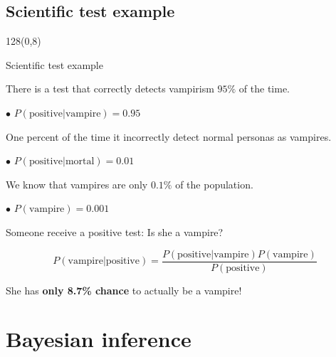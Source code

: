\documentclass[shownotes]{beamer}
\begin{document}
\subsection{Scientific test example}

\begin{frame}
\begin{textblock}{128}(0,8)
\begin{center}
 \large Scientific test example
\end{center}
\end{textblock}
\vspace{0.5cm}


{ \footnotesize
 There is a test that correctly detects vampirism $95\%$ of the time.
 
 $\bullet$ $P(\text{positive}|\text{vampire})=0.95$
 
 \pause \medskip 

 One percent of the time it incorrectly detect normal personas as vampires.
 
 $\bullet$ $P(\text{positive}|\text{mortal})=0.01$
 
 \pause \medskip 
 
 We know that vampires are only $0.1\%$ of the population. 
 
 $\bullet$ $P(\text{vampire})=0.001$

}

\pause

\begin{center}
 Someone receive a positive test: Is she a vampire?
\end{center}
\pause
\begin{equation*}
 P(\text{vampire}|\text{positive}) = \frac{P(\text{positive}|\text{vampire})P(\text{vampire})}{P(\text{positive})}
\end{equation*}

\pause

\begin{center}
 She has \textbf{only 8.7\% chance} to actually be a vampire!
\end{center}




\end{frame}

\section{Bayesian inference}
\end{document}
